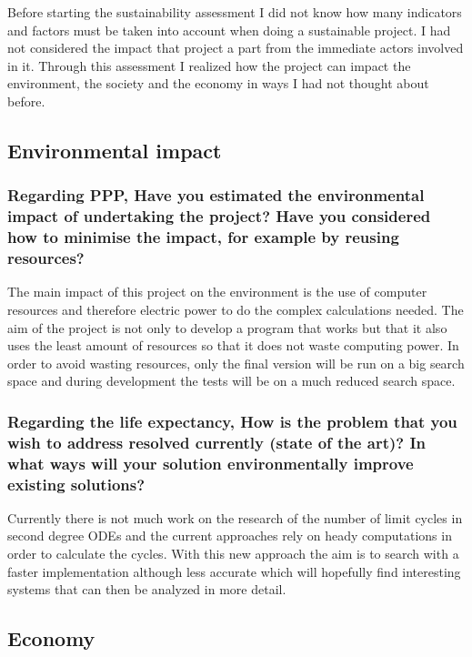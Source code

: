 Before starting the sustainability assessment I did not know how many indicators
and factors must be taken into account when doing a sustainable project. I had
not considered the impact that project a part from the immediate actors involved
in it. Through this assessment I realized how the project can impact the
environment, the society and the economy in ways I had not thought about before.

\subsection{Environmental impact}

\subsubsection*{Regarding PPP, Have you estimated the environmental impact of
undertaking the project? Have you considered how to minimise the impact, for
example by reusing resources?}

The main impact of this project on the environment is the use of computer
resources and therefore electric power to do the complex calculations needed.
The aim of the project is not only to develop a program that works but that it
also uses the least amount of resources so that it does not waste computing
power. In order to avoid wasting resources, only the final version will be run
on a big search space and during development the tests will be on a much reduced
search space.

\subsubsection*{Regarding the life expectancy, How is the problem that you wish
to address resolved currently (state of the art)? In what ways will your
solution environmentally improve existing solutions?}

Currently there is not much work on the research of the number of limit cycles
in second degree ODEs and the current approaches rely on heady computations in
order to calculate the cycles. With this new approach the aim is to search with
a faster implementation although less accurate which will hopefully find
interesting systems that can then be analyzed in more detail.


\pagebreak
\subsection{Economy}

